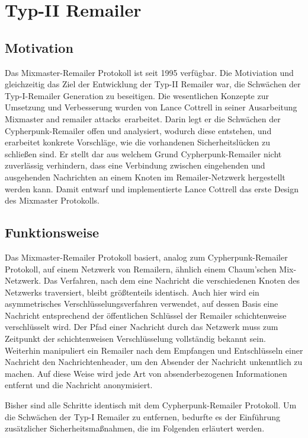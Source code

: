 \chapter{Typ-II Remailer}
\section{Motivation}
Das Mixmaster-Remailer Protokoll ist seit 1995 verfügbar. Die Motiviation und gleichzeitig das Ziel der Entwicklung der Typ-II Remailer war, die Schwächen der Typ-I-Remailer Generation zu beseitigen. Die wesentlichen Konzepte zur Umsetzung und Verbesserung wurden von Lance Cottrell in seiner Ausarbeitung \glqq Mixmaster and remailer attacks\grqq ~erarbeitet. Darin legt er die Schwächen der Cypherpunk-Remailer offen und analysiert, wodurch diese entstehen, und erarbeitet konkrete Vorschläge, wie die vorhandenen Sicherheitslücken zu schließen sind. Er stellt dar aus welchem Grund Cypherpunk-Remailer nicht zuverlässig verhindern, dass eine Verbindung zwischen eingehenden und ausgehenden Nachrichten an einem Knoten im Remailer-Netzwerk hergestellt werden kann\cite[S. 276]{oram2001peer}. Damit entwarf und implementierte Lance Cottrell das erste Design des Mixmaster Protokolls\cite{mixmastermanpage}.

\section{Funktionsweise}
Das Mixmaster-Remailer Protokoll basiert, analog zum Cypherpunk-Remailer Protokoll, auf einem Netzwerk von Remailern, ähnlich einem Chaum'schen Mix-Netzwerk. Das Verfahren, nach dem eine Nachricht die verschiedenen Knoten des Netzwerks traversiert, bleibt größtenteils identisch. Auch hier wird ein asymmetrisches Verschlüsselungsverfahren verwendet, auf dessen Basis eine Nachricht entsprechend der öffentlichen Schlüssel der Remailer schichtenweise verschlüsselt wird. Der Pfad einer Nachricht durch das Netzwerk muss zum Zeitpunkt der schichtenweisen Verschlüsselung vollständig bekannt sein. Weiterhin manipuliert ein Remailer nach dem Empfangen und Entschlüsseln einer Nachricht den Nachrichtenheader, um den Absender der Nachricht unkenntlich zu machen. Auf diese Weise wird jede Art von absenderbezogenen Informationen entfernt und die Nachricht anonymisiert. 

Bisher sind alle Schritte identisch mit dem Cypherpunk-Remailer Protokoll. Um die Schwächen der Typ-I Remailer zu entfernen, bedurfte es der Einführung zusätzlicher Sicherheitsmaßnahmen, die im Folgenden erläutert werden.

